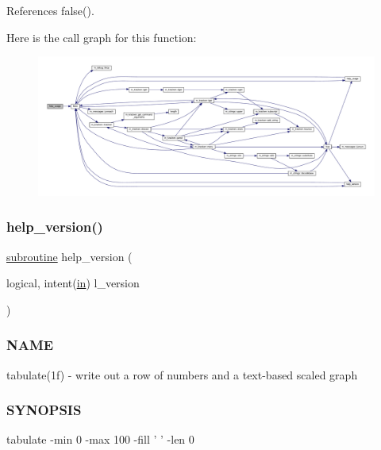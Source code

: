 References false().

Here is the call graph for this function\+:
\nopagebreak
\begin{figure}[H]
\begin{center}
\leavevmode
\includegraphics[width=350pt]{tabulate_8f90_a3e09a3b52ee8fb04eeb93fe5761626a8_cgraph}
\end{center}
\end{figure}
\mbox{\label{tabulate_8f90_a39c21619b08a3c22f19e2306efd7f766}} 
\subsubsection{\texorpdfstring{help\+\_\+version()}{help\_version()}}
{\footnotesize\ttfamily \hyperlink{M__stopwatch_83_8txt_acfbcff50169d691ff02d4a123ed70482}{subroutine} help\+\_\+version (\begin{DoxyParamCaption}\item[{logical, intent(\hyperlink{M__journal_83_8txt_afce72651d1eed785a2132bee863b2f38}{in})}]{l\+\_\+version }\end{DoxyParamCaption})}



\subsubsection*{N\+A\+ME}

tabulate(1f) -\/ write out a row of numbers and a text-\/based scaled graph 

\subsubsection*{S\+Y\+N\+O\+P\+S\+IS}

\begin{DoxyVerb}  tabulate -min 0 -max 100 -fill ' ' -len 0
\end{DoxyVerb}


